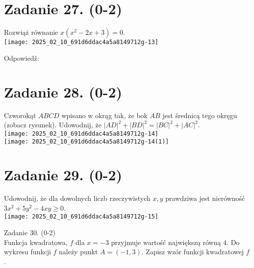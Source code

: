 \documentclass[10pt]{article}
\begin{document}
\section*{Zadanie 27. (0-2)}
Rozwiąż równanie \(x\left(x^{2}-2 x+3\right)=0\).\\
\texttt{[image: 2025\_02\_10\_691d6ddac4a5a8149712g-13]}

Odpowiedź:

\section*{Zadanie 28. (0-2)}
Czworokąt \(A B C D\) wpisano w okrąg tak, że bok \(A B\) jest średnicą tego okręgu (zobacz rysunek). Udowodnij, że \(|A D|^{2}+|B D|^{2}=|B C|^{2}+|A C|^{2}\).\\
\texttt{[image: 2025\_02\_10\_691d6ddac4a5a8149712g-14]}\\
\texttt{[image: 2025\_02\_10\_691d6ddac4a5a8149712g-14(1)]}

\section*{Zadanie 29. (0-2)}
Udowodnij, że dla dowolnych liczb rzeczywistych \(x, y\) prawdziwa jest nierówność \(3 x^{2}+5 y^{2}-4 x y \geq 0\).\\
\texttt{[image: 2025\_02\_10\_691d6ddac4a5a8149712g-15]}

Zadanie 30. (0-2)\\
Funkcja kwadratowa, \(f\) dla \(x=-3\) przyjmuje wartość największą równą 4. Do wykresu funkcji \(f\) należy punkt \(A=(-1,3)\). Zapisz wzór funkcji kwadratowej \(f\).
\end{document}

